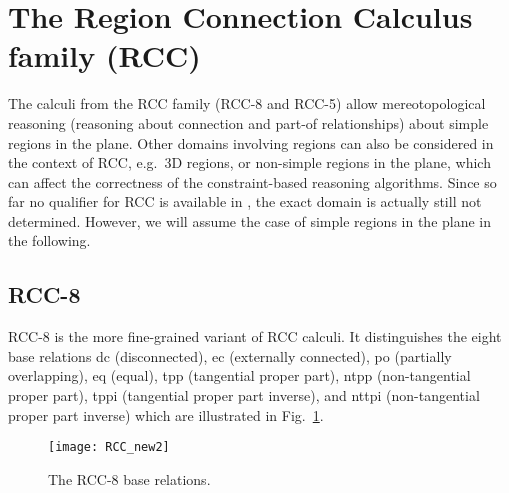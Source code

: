 \section{The Region Connection Calculus family (RCC)}

The calculi from the RCC family (RCC-8 and RCC-5) allow
mereotopological reasoning (reasoning about connection and
part-of relationships) about simple regions in
the plane. Other domains involving regions
can also be considered in the context of RCC, e.g.\
3D regions, or non-simple regions in the plane,
which can affect the correctness of the
constraint-based reasoning algorithms.
Since so far no qualifier for RCC is available in \engine{},
the exact domain is actually still not determined. However, we
will assume the case of simple regions in the plane
in the following.


\subsection*{RCC-8}\label{sec:rcc8}


RCC-8 is the more fine-grained variant of RCC calculi. It distinguishes
the eight base relations  dc (disconnected), ec (externally connected),
po (partially overlapping), eq (equal), tpp (tangential proper part), ntpp (non-tangential proper part), tppi (tangential proper part inverse), and nttpi (non-tangential proper part inverse) which are illustrated in Fig.~\ref{fig:RCC8}.

\begin{figure}[ht]
	\centering
	\texttt{[image: RCC\_new2]}
	\caption{The RCC-8 base relations.}
	\label{fig:RCC8}
\end{figure}

